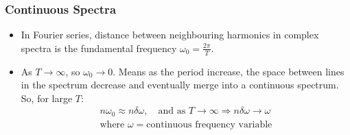 \subsubsection{Continuous Spectra}
\begin{itemize}
    \item In Fourier series, distance between neighbouring harmonics in complex spectra is the fundamental frequency $\omega_0=\frac{2\pi}{T}$.
    \item As $T\rightarrow\infty$, so $\omega_0\rightarrow 0$. Means as the period increase, the space between lines in the spectrum decrease and eventually merge into a continuous spectrum. So, for large $T$:
    \begin{align}
        n\omega_0\approx n\delta\omega,\quad\text{and as }T\rightarrow\infty\Rightarrow n\delta\omega\rightarrow\omega\\
        \text{where $\omega$}=\text{continuous frequency variable}\nonumber
    \end{align}
\end{itemize}
